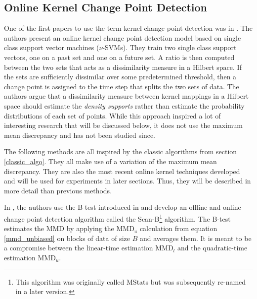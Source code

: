 \subsection{Online Kernel Change Point Detection}
One of the first papers to use the term kernel change point detection was in \cite{desobry2005online}. The authors present an online kernel change point detection model based on single class support vector machines ($\nu$-SVMs). They train two single class support vectors, one on a past set and one on a future set. A ratio is then computed between the two sets that acts as a dissimilarity measure in a Hilbert space. If the sets are sufficiently dissimilar over some predetermined threshold, then a change point is assigned to the time step that splits the two sets of data. The authors argue that a dissimilarity measure between kernel mappings in a Hilbert space should estimate the \textit{density supports} rather than estimate the probability distributions of each set of points. While this approach inspired a lot of interesting research that will be discussed below, it does not use the maximum mean discrepancy and has not been studied since.

The following methods are all inspired by the classic algorithms from section \ref{classic_algo}. They all make use of a variation of the maximum mean discrepancy. They are also the most recent online kernel techniques developed and will be used for experiments in later sections. Thus, they will be described in more detail than previous methods.

In  \cite{li2015m}, the authors use the B-test introduced in \cite{zaremba2013b} and develop an offline and online change point detection algorithm called the Scan-B\footnote{This algorithm was originally called MStats but was subsequently re-named in a later version.} algorithm. The B-test estimates the MMD by applying the MMD$_u$ calculation from equation \ref{mmd_unbiased} on blocks of data of size $B$ and averages them. It is meant to be a compromise between the linear-time estimation MMD$_l$ and the quadratic-time estimation MMD$_u$.

